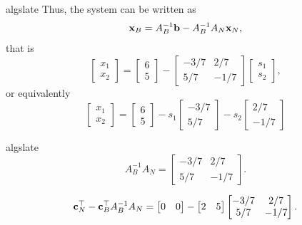 \begin{solution}
\begin{steppanel}{algslate}
Thus, the system can be written as 
$$
\mathbf{x}_B = A_B^{-1} \mathbf{b} - A_B^{-1}A_N \mathbf{x}_N,
$$
that is
\begin{equation}
\begin{bmatrix} x_1 \\ x_2\end{bmatrix} = \begin{bmatrix} 6 \\ 5\end{bmatrix} - \begin{bmatrix}
    -3/7 & 2/7 \\
    5/7 & -1/7
\end{bmatrix} \begin{bmatrix} s_1 \\ s_2 \end{bmatrix},
\end{equation}
or equivalently
\begin{equation}
\begin{bmatrix} x_1 \\ x_2\end{bmatrix} = \begin{bmatrix} 6 \\ 5\end{bmatrix} - s_1 \begin{bmatrix}
    -3/7  \\
    5/7 
\end{bmatrix} - s_2 \begin{bmatrix}
     2/7 \\
    -1/7
\end{bmatrix} 
\end{equation}

\end{steppanel}
\begin{steppanel}{algslate}
\[
A_B^{-1} A_N =
\begin{bmatrix}
    -3/7 & 2/7 \\
    5/7 & -1/7
\end{bmatrix}.
\]

\[
\mathbf{c}_N^\top -\mathbf{c}_B^\top A_B^{-1} A_N =
\begin{bmatrix}
    0 & 0
\end{bmatrix}
-
\begin{bmatrix}
    2 & 5
\end{bmatrix}
\begin{bmatrix}
    -3/7 & 2/7 \\
    5/7 & -1/7
\end{bmatrix}.
\]


\end{steppanel}
\end{solution}
